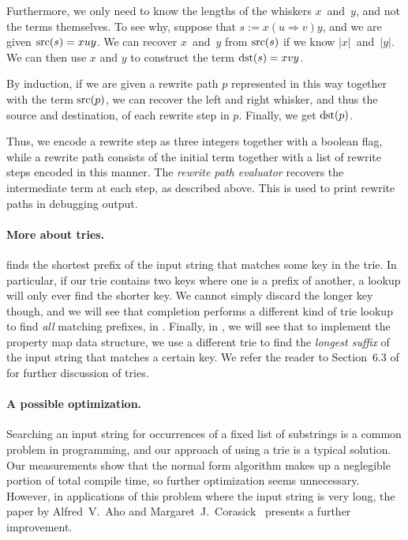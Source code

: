 \documentclass[../generics]{subfiles}
\begin{document}
Furthermore, we only need to know the lengths of the whiskers $x$~and~$y$, and not the terms themselves. To see why, suppose that $s:=x(u\Rightarrow v)y$, and we are given $\operatorname{src}(s)=xuy$. We can recover $x$~and~$y$ from $\operatorname{src}(s)$ if we know $|x|$~and~$|y|$. We can then use $x$ and $y$ to construct the term $\operatorname{dst}(s)=xvy$.

By induction, if we are given a rewrite path $p$ represented in this way together with the term $\operatorname{src}(p)$, we can recover the left and right whisker, and thus the source and destination, of each rewrite step in $p$. Finally, we get $\operatorname{dst}(p)$.

Thus, we encode a rewrite step as three integers together with a boolean flag, while a rewrite path consists of the initial term together with a list of rewrite steps encoded in this manner. The \emph{rewrite path evaluator} recovers the intermediate term at each step, as described above. This is used to print rewrite paths in debugging output.

\paragraph{More about tries.}  finds the shortest prefix of the input string that matches some key in the trie. In particular, if our trie contains two keys where one is a prefix of another, a lookup will only ever find the shorter key. We cannot simply discard the longer key though, and we will see that completion performs a different kind of trie lookup to find \emph{all} matching prefixes, in . Finally, in , we will see that to implement the property map data structure, we use a different trie to find the \emph{longest suffix} of the input string that matches a certain key. We refer the reader to Section~6.3 of \cite{art3} for further discussion of tries.

\paragraph{A possible optimization.}
Searching an input string for occurrences of a fixed list of substrings is a common problem in programming, and our approach of using a trie is a typical solution. Our measurements show that the normal form algorithm makes up a neglegible portion of total compile time, so further optimization seems unnecessary. However, in applications of this problem where the input string is very long, the paper by Alfred~V.~Aho and Margaret~J.~Corasick~\cite{ahocorasick} presents a further improvement.
\end{document}
